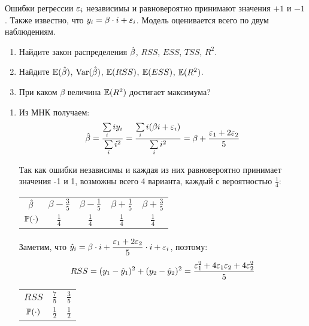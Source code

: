 \begin{problem}
Ошибки регрессии $\e_i$ независимы и равновероятно принимают значения $+1$ и $-1$. Также известно, что $y_i=\beta \cdot i +\e_i$. Модель оценивается всего по двум наблюдениям.
\begin{enumerate}
\item Найдите закон распределения $\hb$, $RSS$, $ESS$, $TSS$, $R^2$.
\item Найдите $\E(\hb)$, $\Var(\hb)$, $\E(RSS)$, $\E(ESS)$, $\E(R^2)$.
\item При каком $\beta$ величина $\E(R^2)$ достигает максимума?
\end{enumerate}


\begin{sol}

\begin{enumerate}

\item
Из МНК получаем:
\[
\hb = \frac{\sum\limits_i iy_i}{\sum\limits_i i^2} = \frac{\sum\limits_i i(\beta i+\e_i)}{\sum\limits_i i^2} = \beta + \frac{\e_1 + 2\e_2}{5}
\]

Так как ошибки независимы и каждая из них равновероятно принимает значения -1 и 1, возможны всего 4 варианта, каждый с вероятностью $\frac{1}{4}$:

\def\arraystretch{1.5}

\begin{center}
\begin{tabular}{c|cccc}
\toprule
$\hb$ & $\beta - \frac{3}{5}$ & $\beta - \frac{1}{5}$ & $\beta + \frac{1}{5}$ & $\beta + \frac{3}{5}$ \\
$\P(\cdot)$ & $\frac{1}{4}$ & $\frac{1}{4}$ & $\frac{1}{4}$ & $\frac{1}{4}$ \\
\bottomrule
\end{tabular}
\end{center}

Заметим, что $\hy_i = \beta\cdot i + \dfrac{\e_1 + 2\e_2}{5}\cdot i + \e_i$, поэтому:
\[
RSS = (y_1 - \hy_1)^2 + (y_2 - \hy_2)^2 = \frac{\e_1^2 + 4\e_1\e_2 + 4\e_2^2}{5}
\]

\begin{center}
\begin{tabular}{c|cc}
\toprule
$RSS$ & $\frac{7}{5}$ & $\frac{3}{5}$ \\
$\P(\cdot)$ & $\frac{1}{2}$ & $\frac{1}{2}$\\
\bottomrule
\end{tabular}
\end{center}


\end{enumerate}
\end{sol}
\end{problem}
